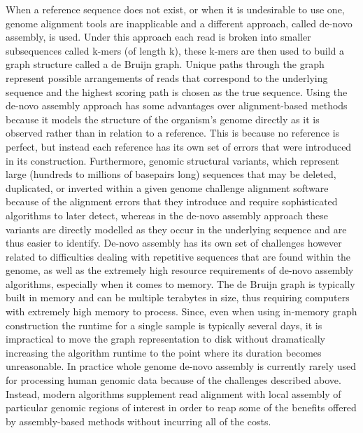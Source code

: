 When a reference sequence does not exist, or when it is undesirable to use one, genome alignment tools are inapplicable and a different approach, called de-novo assembly, is used. Under this approach each read is broken into smaller subsequences called k-mers (of length k), these k-mers are then used to build a graph structure called a de Bruijn graph. Unique paths through the graph represent possible arrangements of reads that correspond to the underlying sequence and the highest scoring path is chosen as the true sequence. Using the de-novo assembly approach has some advantages over alignment-based methods because it models the structure of the organism's genome directly as it is observed rather than in relation to a reference. This is because no reference is perfect, but instead each reference has its own set of errors that were introduced in its construction. Furthermore, genomic structural variants, which represent large (hundreds to millions of basepairs long) sequences that may be deleted, duplicated, or inverted within a given genome challenge alignment software because of the alignment errors that they introduce and require sophisticated algorithms to later detect, whereas in the de-novo assembly approach these variants are directly modelled as they occur in the underlying sequence and are thus easier to identify. De-novo assembly has its own set of challenges however related to difficulties dealing with repetitive sequences that are found within the genome, as well as the extremely high resource requirements of de-novo assembly algorithms, especially when it comes to memory. The de Bruijn graph is typically built in memory and can be multiple terabytes in size, thus requiring computers with extremely high memory to process. Since, even when using in-memory graph construction the runtime for a single sample is typically several days, it is impractical to move the graph representation to disk without dramatically increasing the algorithm runtime to the point where its duration becomes unreasonable. In practice whole genome de-novo assembly is currently rarely used for processing human genomic data because of the challenges described above. Instead, modern algorithms supplement read alignment with local assembly of particular genomic regions of interest in order to reap some of the benefits offered by assembly-based methods without incurring all of the costs. 

